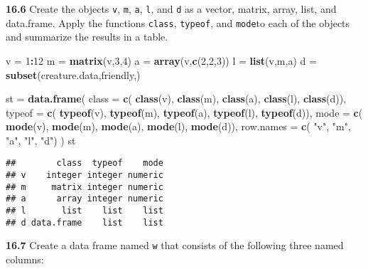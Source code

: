 \documentclass[]{article}
\newenvironment{Shaded}{\begin{snugshade}}{\end{snugshade}}
\newcommand{\KeywordTok}[1]{\textcolor[rgb]{0.13,0.29,0.53}{\textbf{#1}}}
\newcommand{\DataTypeTok}[1]{\textcolor[rgb]{0.13,0.29,0.53}{#1}}
\newcommand{\DecValTok}[1]{\textcolor[rgb]{0.00,0.00,0.81}{#1}}
\newcommand{\StringTok}[1]{\textcolor[rgb]{0.31,0.60,0.02}{#1}}
\newcommand{\OperatorTok}[1]{\textcolor[rgb]{0.81,0.36,0.00}{\textbf{#1}}}
\newcommand{\NormalTok}[1]{#1}
\begin{document}
\textbf{16.6} Create the objects \texttt{v}, \texttt{m}, \texttt{a},
\texttt{l}, and \texttt{d} as a vector, matrix, array, list, and
data.frame. Apply the functions \texttt{class}, \texttt{typeof}, and
\texttt{mode}to each of the objects and summarize the results in a
table.

\begin{Shaded}
\begin{Highlighting}[]
\NormalTok{v =}\StringTok{ }\DecValTok{1}\OperatorTok{:}\DecValTok{12}
\NormalTok{m =}\StringTok{ }\KeywordTok{matrix}\NormalTok{(v,}\DecValTok{3}\NormalTok{,}\DecValTok{4}\NormalTok{)}
\NormalTok{a =}\StringTok{ }\KeywordTok{array}\NormalTok{(v,}\KeywordTok{c}\NormalTok{(}\DecValTok{2}\NormalTok{,}\DecValTok{2}\NormalTok{,}\DecValTok{3}\NormalTok{))}
\NormalTok{l =}\StringTok{ }\KeywordTok{list}\NormalTok{(v,m,a)}
\NormalTok{d =}\StringTok{ }\KeywordTok{subset}\NormalTok{(creature.data,friendly,)}

\NormalTok{st =}\StringTok{ }\KeywordTok{data.frame}\NormalTok{(}
    \DataTypeTok{class  =}    \KeywordTok{c}\NormalTok{(  }\KeywordTok{class}\NormalTok{(v),   }\KeywordTok{class}\NormalTok{(m),   }\KeywordTok{class}\NormalTok{(a),   }\KeywordTok{class}\NormalTok{(l),   }\KeywordTok{class}\NormalTok{(d)), }
    \DataTypeTok{typeof =}    \KeywordTok{c}\NormalTok{(  }\KeywordTok{typeof}\NormalTok{(v),  }\KeywordTok{typeof}\NormalTok{(m),  }\KeywordTok{typeof}\NormalTok{(a),  }\KeywordTok{typeof}\NormalTok{(l),  }\KeywordTok{typeof}\NormalTok{(d)),}
    \DataTypeTok{mode   =}    \KeywordTok{c}\NormalTok{(  }\KeywordTok{mode}\NormalTok{(v),    }\KeywordTok{mode}\NormalTok{(m),    }\KeywordTok{mode}\NormalTok{(a),    }\KeywordTok{mode}\NormalTok{(l),    }\KeywordTok{mode}\NormalTok{(d)),}
    \DataTypeTok{row.names =} \KeywordTok{c}\NormalTok{(  }\StringTok{"v"}\NormalTok{,        }\StringTok{"m"}\NormalTok{,        }\StringTok{"a"}\NormalTok{,        }\StringTok{"l"}\NormalTok{,        }\StringTok{"d"}\NormalTok{)}
\NormalTok{)}
\NormalTok{st}
\end{Highlighting}
\end{Shaded}

\begin{verbatim}
##        class  typeof    mode
## v    integer integer numeric
## m     matrix integer numeric
## a      array integer numeric
## l       list    list    list
## d data.frame    list    list
\end{verbatim}

\textbf{16.7} Create a data frame named \texttt{w} that consists of the
following three named columns:
\end{document}
